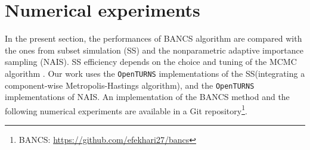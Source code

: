 
%



\section{Numerical experiments}

In the present section, the performances of BANCS algorithm are compared with the ones from subset simulation (SS) and the nonparametric adaptive importance sampling (NAIS). 
SS efficiency depends on the choice and tuning of the MCMC algorithm \citep{Papaioannou_PEM_2015}. 
Our work uses the \texttt{OpenTURNS} implementations of the SS\footnotemark (integrating a component-wise Metropolis-Hastings algorithm), 
and the \texttt{OpenTURNS} implementations of NAIS\footnotemark. 
An implementation of the BANCS method and the following numerical experiments are available in a Git repository\footnote{BANCS: \url{https://github.com/efekhari27/bancs}}. 

